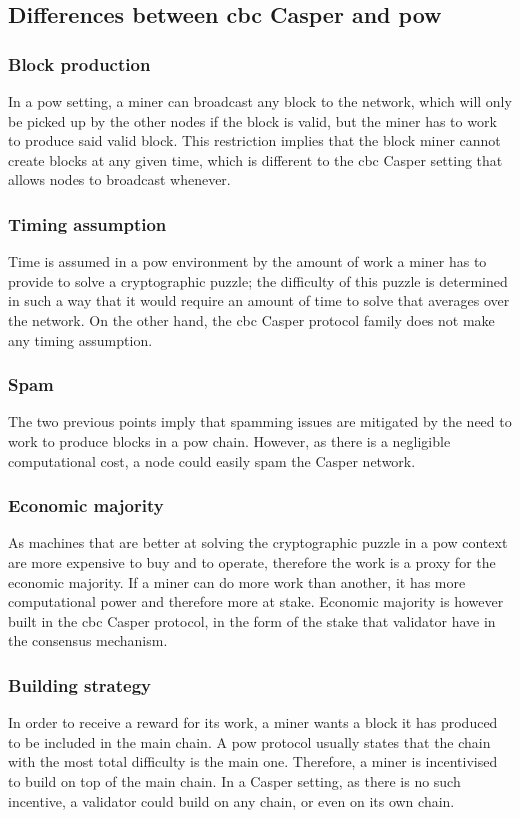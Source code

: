 \FloatBarrier
\subsection{Differences between \gls{cbc} Casper and \gls{pow}}
\label{ssec:powVsPos}
\subsubsection{Block production}
In a \gls{pow}\cite{yellowpaper} setting, a miner can broadcast any block to the
network, which will only be picked up by the other nodes if the block is valid,
but the miner has to work to produce said valid block. This restriction implies
that the block miner cannot create blocks at any given time, which is different
to the \gls{cbc} Casper setting that allows nodes to broadcast whenever. 

\subsubsection{Timing assumption}
Time is assumed in a \gls{pow} environment by the amount of work a miner has to
provide to solve a cryptographic puzzle; the difficulty of this puzzle is
determined in such a way that it would require an amount of time to solve that
averages over the network. On the other hand, the \gls{cbc} Casper protocol
family does not make any timing assumption.

\subsubsection{Spam}
The two previous points imply that spamming issues are mitigated by the need to
work to produce blocks in a \gls{pow} chain. However, as there is a negligible
computational cost, a node could easily spam the Casper network.

\subsubsection{Economic majority}
As machines that are better at solving the cryptographic puzzle in a \gls{pow}
context are more expensive to buy and to operate, therefore the work is a proxy
for the economic majority. If a miner can do more work than another, it has more
computational power and therefore more at stake.
Economic majority is however built in the \gls{cbc} Casper protocol, in the form
of the stake that validator have in the consensus mechanism.

\subsubsection{Building strategy}
In order to receive a reward for its work, a miner wants a block it has produced
to be included in the main chain. A \gls{pow} protocol usually states that the
chain with the most total difficulty is the main one. Therefore, a miner is
incentivised to build on top of the main chain. 
In a Casper setting, as there is no such incentive, a validator could build on
any chain, or even on its own chain.


